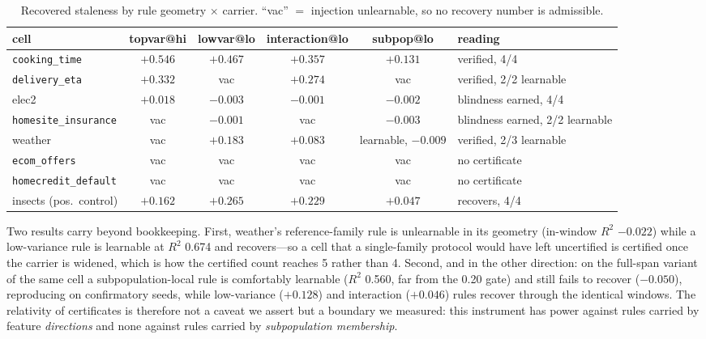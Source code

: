\documentclass[10pt]{article} %
\begin{document}
\begin{table}[h]
\caption{Recovered staleness by rule geometry $\times$ carrier. ``vac'' $=$ injection unlearnable,
so no recovery number is admissible.}
\label{tab:famsweep}
\centering
\scriptsize
\setlength{\tabcolsep}{4pt}
\begin{tabular}{@{}lccccl@{}}
\toprule
cell & topvar@hi & lowvar@lo & interaction@lo & subpop@lo & reading \\
\midrule
\texttt{cooking\_time} & $+0.546$ & $+0.467$ & $+0.357$ & $+0.131$ & verified, 4/4 \\
\texttt{delivery\_eta} & $+0.332$ & vac & $+0.274$ & vac & verified, 2/2 learnable \\
elec2 & $+0.018$ & $-0.003$ & $-0.001$ & $-0.002$ & blindness earned, 4/4 \\
\texttt{homesite\_insurance} & vac & $-0.001$ & vac & $-0.003$ & blindness earned, 2/2 learnable \\
weather & vac & $\mathbf{+0.183}$ & $\mathbf{+0.083}$ & learnable, $\mathbf{-0.009}$ & verified, 2/3 learnable \\
\texttt{ecom\_offers} & vac & vac & vac & vac & no certificate \\
\texttt{homecredit\_default} & vac & vac & vac & vac & no certificate \\
insects (pos.\ control) & $+0.162$ & $+0.265$ & $+0.229$ & $+0.047$ & recovers, 4/4 \\
\bottomrule
\end{tabular}
\end{table}

Two results carry beyond bookkeeping. First, weather's reference-family rule is unlearnable in its
geometry (in-window $R^2$ $-0.022$) while a low-variance rule is learnable at $R^2$ 0.674 and
recovers---so a cell that a single-family protocol would have left uncertified is certified once
the carrier is widened, which is how the certified count reaches 5 rather than 4. Second, and in
the other direction: on the full-span variant of the same cell a subpopulation-local rule is
comfortably learnable ($R^2$ 0.560, far from the 0.20 gate) and still fails to recover
($-0.050$), reproducing on confirmatory seeds, while low-variance ($+0.128$) and interaction
($+0.046$) rules recover through the identical windows. The relativity of certificates is
therefore not a caveat we assert but a boundary we measured: this instrument has power against
rules carried by feature \emph{directions} and none against rules carried by \emph{subpopulation
membership}.
\end{document}
